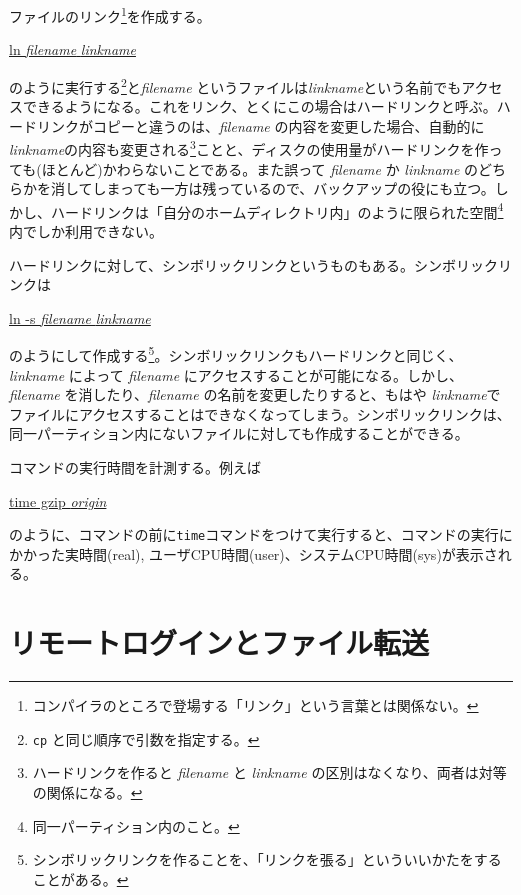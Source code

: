 \begin{itemize}
ファイルのリンク\footnote{コンパイラのところで登場する「リンク」という言葉とは関係ない。}を作成する。
\begin{commandline2}
\prompt \underline{ln {\it filename} {\it linkname}}
\end{commandline2} \noindent
のように実行する\footnote{{\tt cp} と同じ順序で引数を指定する。}と{\it filename} というファイルは{\it linkname}という名前でもアクセスできるようになる。これをリンク、とくにこの場合はハードリンクと呼ぶ。ハードリンクがコピーと違うのは、{\it filename} の内容を変更した場合、自動的に {\it linkname}の内容も変更される\footnote{ハードリンクを作ると {\it filename} と {\it linkname} の区別はなくなり、両者は対等の関係になる。}ことと、ディスクの使用量がハードリンクを作っても(ほとんど)かわらないことである。また誤って {\it filename} か {\it linkname} のどちらかを消してしまっても一方は残っているので、バックアップの役にも立つ。しかし、ハードリンクは「自分のホームディレクトリ内」のように限られた空間\footnote{同一パーティション内のこと。}内でしか利用できない。

ハードリンクに対して、シンボリックリンクというものもある。シンボリックリンクは
\begin{commandline2}
\prompt \underline{ln -s {\it filename} {\it linkname}}
\end{commandline2} \noindent
のようにして作成する\footnote{シンボリックリンクを作ることを、「リンクを張る」といういいかたをすることがある。}。シンボリックリンクもハードリンクと同じく、{\it linkname} によって {\it filename} にアクセスすることが可能になる。しかし、 {\it filename} を消したり、{\it filename} の名前を変更したりすると、もはや {\it linkname}でファイルにアクセスすることはできなくなってしまう。シンボリックリンクは、同一パーティション内にないファイルに対しても作成することができる。


コマンドの実行時間を計測する。例えば
\begin{commandline2}
\prompt \underline{time gzip {\it origin}}
\end{commandline2} \noindent
のように、コマンドの前に{\tt time}コマンドをつけて実行すると、コマンドの実行にかかった実時間(real), ユーザCPU時間(user)、システムCPU時間(sys)が表示される。

\end{itemize}

\section{リモートログインとファイル転送}
\label{sec:ssh}

